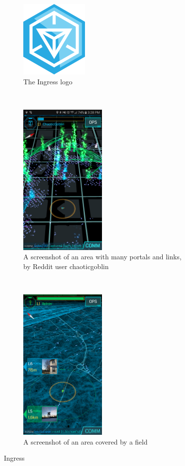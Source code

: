 \begin{figure}[h]
	\centering
	\begin{subfigure}[b]{0.3\textwidth}
		\centering
		\includegraphics{Figures/ingress-logo}
		\caption{The Ingress logo}
	\end{subfigure}
	~
	\begin{subfigure}[t]{0.3\textwidth}
		\centering
		\includegraphics[height=3in]{Figures/chaoticgoblin-ingress-screenshot}
		\caption{A screenshot of an area with many portals and links, by Reddit user chaoticgoblin}
	\end{subfigure}
	~
	\begin{subfigure}[t]{0.3\textwidth}
		\centering
		\includegraphics[height=3in]{Figures/ingress-fielded-area}
		\caption{A screenshot of an area covered by a field}
	\end{subfigure}
	\caption{Ingress}
\end{figure}

